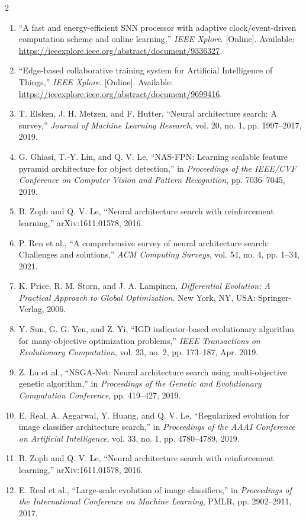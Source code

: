 \begin{multicols}{2}
{\begin{enumerate}[leftmargin=*,itemsep=0.20em]
    \item “A fast and energy-efficient SNN processor with adaptive clock/event-driven computation scheme and online learning,” \textit{IEEE Xplore}. [Online]. Available: \url{https://ieeexplore.ieee.org/abstract/document/9336327}.
    \item “Edge-based collaborative training system for Artificial Intelligence of Things,” \textit{IEEE Xplore}. [Online]. Available: \url{https://ieeexplore.ieee.org/abstract/document/9699416}.
    \item T. Elsken, J. H. Metzen, and F. Hutter, “Neural architecture search: A survey,” \textit{Journal of Machine Learning Research}, vol. 20, no. 1, pp. 1997--2017, 2019.
    \item G. Ghiasi, T.-Y. Lin, and Q. V. Le, “NAS-FPN: Learning scalable feature pyramid architecture for object detection,” in \textit{Proceedings of the IEEE/CVF Conference on Computer Vision and Pattern Recognition}, pp. 7036--7045, 2019.
    \item B. Zoph and Q. V. Le, “Neural architecture search with reinforcement learning,” arXiv:1611.01578, 2016.
    \item P. Ren et al., “A comprehensive survey of neural architecture search: Challenges and solutions,” \textit{ACM Computing Surveys}, vol. 54, no. 4, pp. 1--34, 2021.
    \item K. Price, R. M. Storn, and J. A. Lampinen, \textit{Differential Evolution: A Practical Approach to Global Optimization}. New York, NY, USA: Springer-Verlag, 2006.
    \item Y. Sun, G. G. Yen, and Z. Yi, “IGD indicator-based evolutionary algorithm for many-objective optimization problems,” \textit{IEEE Transactions on Evolutionary Computation}, vol. 23, no. 2, pp. 173--187, Apr. 2019.
    \item Z. Lu et al., “NSGA-Net: Neural architecture search using multi-objective genetic algorithm,” in \textit{Proceedings of the Genetic and Evolutionary Computation Conference}, pp. 419--427, 2019.
    \item E. Real, A. Aggarwal, Y. Huang, and Q. V. Le, “Regularized evolution for image classifier architecture search,” in \textit{Proceedings of the AAAI Conference on Artificial Intelligence}, vol. 33, no. 1, pp. 4780--4789, 2019.
    \item B. Zoph and Q. V. Le, “Neural architecture search with reinforcement learning,” arXiv:1611.01578, 2016.
    \item E. Real et al., “Large-scale evolution of image classifiers,” in \textit{Proceedings of the International Conference on Machine Learning}, PMLR, pp. 2902--2911, 2017.

\end{enumerate}}
\end{multicols}
